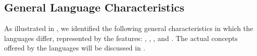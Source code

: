 




	
\subsection{General Language Characteristics}\label{sec:langcharacteristics}
As illustrated in , we identified the following general characteristics in which the languages differ, represented by the features: \fnotation, \fsemantics, \flangparadigm, and \fextensibility. The actual concepts offered by the languages will be discussed in .


